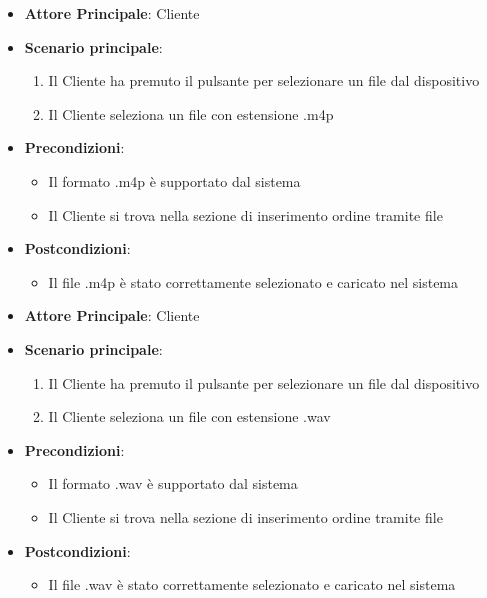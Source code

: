 \label{uc_13.2.3}

\begin{itemize}
    \item \textbf{Attore Principale}: Cliente
    \item \textbf{Scenario principale}:
        \begin{enumerate}
            \item Il Cliente ha premuto il pulsante per selezionare un file dal dispositivo
            \item Il Cliente seleziona un file con estensione .m4p
        \end{enumerate}
    \item \textbf{Precondizioni}:
        \begin{itemize}
            \item Il formato .m4p è supportato dal sistema
            \item Il Cliente si trova nella sezione di inserimento ordine tramite file
        \end{itemize}
    \item \textbf{Postcondizioni}: 
        \begin{itemize}
            \item Il file .m4p è stato correttamente selezionato e caricato nel sistema
        \end{itemize}
\end{itemize}

\label{uc_13.2.4}

\begin{itemize}
    \item \textbf{Attore Principale}: Cliente
    \item \textbf{Scenario principale}:
        \begin{enumerate}
            \item Il Cliente ha premuto il pulsante per selezionare un file dal dispositivo
            \item Il Cliente seleziona un file con estensione .wav
        \end{enumerate}
    \item \textbf{Precondizioni}:
        \begin{itemize}
            \item Il formato .wav è supportato dal sistema
            \item Il Cliente si trova nella sezione di inserimento ordine tramite file
        \end{itemize}
    \item \textbf{Postcondizioni}: 
        \begin{itemize}
            \item Il file .wav è stato correttamente selezionato e caricato nel sistema
        \end{itemize}
\end{itemize}